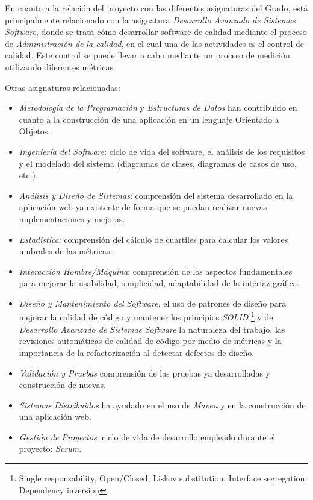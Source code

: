 En cuanto a la relación del proyecto con las diferentes asignaturas del Grado, está principalmente relacionado con la asignatura \textit{Desarrollo Avanzado de Sistemas Software}, donde se trata cómo desarrollar software de calidad mediante el proceso de \textit{Administración de la calidad}, en el cual una de las actividades es el control de calidad. Este control se puede llevar a cabo mediante un proceso de medición utilizando diferentes métricas.


Otras asignaturas relacionadas: 
\begin{itemize}
	\tightlist
	\item \textit{Metodología de la Programación} y \textit{Estructuras de Datos} han contribuido en cuanto a la construcción de una aplicación en un lenguaje Orientado a Objetos.	
		\item \textit{Ingeniería del Software}: ciclo de vida del software, el análisis de los requisitos y el modelado del sistema (diagramas de clases, diagramas de casos de uso, etc.).
		\item \textit{Análisis y Diseño de Sistemas}: comprensión del sistema desarrollado en la aplicación web ya existente \cite{TFGPrevio} de forma que se puedan realizar nuevas implementaciones y mejoras.
	\item \textit{Estadística}: comprensión del cálculo de cuartiles para calcular los valores umbrales de las métricas.
	\item \textit{Interacción Hombre/Máquina}: comprensión de los aspectos fundamentales para mejorar la usabilidad, simplicidad, adaptabilidad de la interfaz gráfica.
	\item \textit{Diseño y Mantenimiento del Software}, el uso de patrones de diseño para mejorar la calidad de código y mantener los principios \textit{SOLID}  \footnote{Single responsability, Open/Closed, Liskov substitution, Interface segregation, Dependency inversion} y de \textit{Desarrollo Avanzado de Sistemas Software} la naturaleza del trabajo, las revisiones automáticas de calidad de código por medio de métricas y la importancia de la refactorización al detectar defectos de diseño.
	\item \textit{Validación y Pruebas} comprensión de las pruebas ya desarrolladas y construcción de nuevas.
	\item \textit{Sistemas Distribuidos} ha ayudado en el uso de \textit{Maven} y en la construcción de una aplicación web.
	\item \textit{Gestión de Proyectos}: ciclo de vida de desarrollo empleado durante el proyecto: \textit{Scrum}\cite{scrum_master_scrum_2019}.
\end{itemize}

